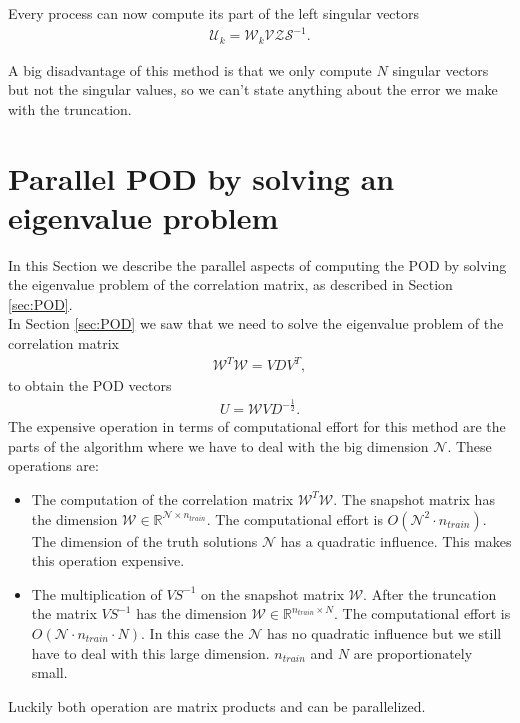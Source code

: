 Every process can now compute its part of the left singular vectors
\begin{align*}
\mathcal{U}_k =  \mathcal{W}_k \mathcal{V} \mathcal{Z} \mathcal{S}^{-1}.
\end{align*}

A big disadvantage of this method is that we only compute $N$ singular vectors but not the singular values, so we can't state anything about the error we make with the truncation. 

\newpage



\section{Parallel POD by solving an eigenvalue problem}
\label{sec:algsimp}
In this Section we describe the parallel aspects of computing the POD by solving the eigenvalue problem of the correlation matrix, as described in Section \ref{sec:POD}.\\
In Section \ref{sec:POD} we saw that we need to solve the eigenvalue problem of the correlation matrix
\begin{align}
\label{eq:evpshort}
\mathcal{W}^T \mathcal{W} = V D V^T,
\end{align}
to obtain the POD vectors 
\begin{align}
\label{eq:afterevp}
U = \mathcal{W}VD^{-\frac{1}{2}}.
\end{align}
The expensive operation in terms of computational effort for this method are the parts of the algorithm where we have to deal with the big dimension $\mathcal{ N }$. These operations are:
\begin{itemize}
	\item The computation of the correlation matrix $\mathcal{W}^T\mathcal{W}$. 
	The snapshot matrix has the dimension $\mathcal{W} \in \mathbb{R}^{\mathcal{ N } \times n_{train}}$.
	The computational effort is $ O(\mathcal{ N }^2 \cdot n_{train})$. 
	The dimension of the truth solutions $\mathcal{ N }$ has a quadratic influence. This makes this operation expensive.
	
	\item The multiplication of $VS^{-1}$ on the snapshot matrix $\mathcal{W}$.
	After the truncation the matrix $VS^{-1}$ has the dimension $\mathcal{W} \in \mathbb{R}^{  n_{train} \times N}$.
	The computational effort is $ O(\mathcal{ N } \cdot n_{train} \cdot N)$. 
	In this case the $\mathcal{ N }$ has no quadratic influence but we still have to deal with this large dimension.
	$n_{train} $ and $ N$ are proportionately small.
\end{itemize}
Luckily both operation are matrix products and can  be parallelized.

